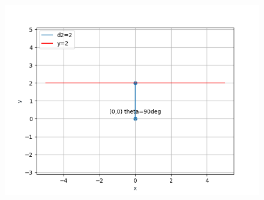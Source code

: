 \documentclass[12pt]{article}
\begin{document}
\begin{enumerate}
\begin{figure}[!h]
\begin{center}
	    \includegraphics[width=\columnwidth]{./figs/line2.png}
	\end{center}
\caption{}
\label{fig:Fig}
\end{figure}
	

\end{enumerate}
\end{document}
